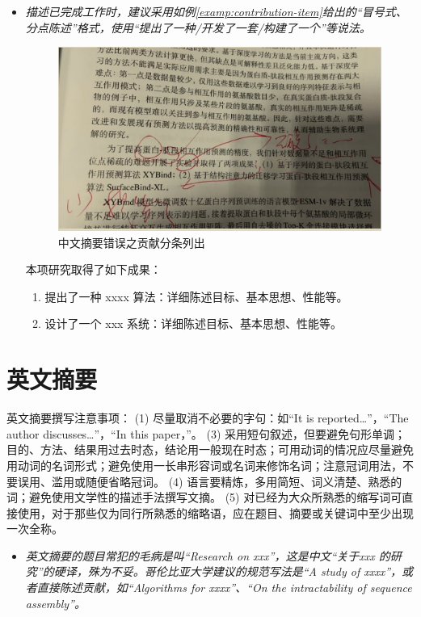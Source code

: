 \begin{itemize}
\item \emph{描述已完成工作时，建议采用如例\ref{examp:contribution-item}给出的“冒号式、分点陈述”格式，使用“提出了一种/开发了一套/构建了一个”等说法。}
\begin{figure}[!htpb]
\centering
\includegraphics[scale=0.65]{doc/figures/chk02.jpg}
\caption{中文摘要错误之贡献分条列出}
\label{fig:abstract-error-contribution}
\end{figure}
\begin{example}\label{examp:contribution-item}
本项研究取得了如下成果：
\begin{enumerate}
    \item 提出了一种 xxxx 算法：详细陈述目标、基本思想、性能等。
    \item 设计了一个 xxx 系统：详细陈述目标、基本思想、性能等。
\end{enumerate}
\end{example}
\end{itemize}

\section{英文摘要}
英文摘要撰写注意事项：
(1) 尽量取消不必要的字句：如“It is reported…”，“The author discusses…”，“In this paper，”。 
(3) 采用短句叙述，但要避免句形单调；目的、方法、结果用过去时态，结论用一般现在时态；可用动词的情况应尽量避免用动词的名词形式；避免使用一长串形容词或名词来修饰名词；注意冠词用法，不要误用、滥用或随便省略冠词。
(4) 语言要精炼，多用简短、词义清楚、熟悉的词；避免使用文学性的描述手法撰写文摘。
(5) 对已经为大众所熟悉的缩写词可直接使用，对于那些仅为同行所熟悉的缩略语，应在题目、摘要或关键词中至少出现一次全称。
\begin{itemize}
\item \emph{英文摘要的题目常犯的毛病是叫“Research on xxx”，这是中文“关于xxx 的研究”的硬译，殊为不妥。哥伦比亚大学建议的规范写法是“A study of xxxx”，或者直接陈述贡献，如“Algorithms for xxxx”、“On the intractability of sequence assembly”。}
\end{itemize}


